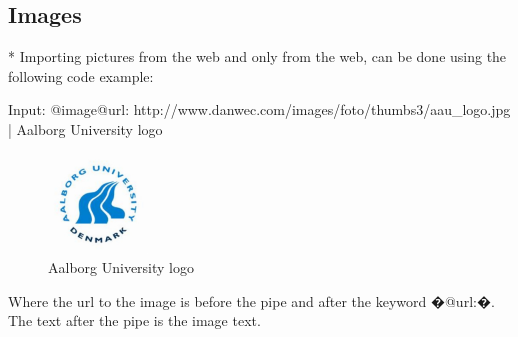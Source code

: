 \subsection{Images}*
Importing pictures from the web and only from the web, can be done using the following code example:

\begin{spverbatim}
Input: @image{@url: http://www.danwec.com/images/foto/thumbs3/aau_logo.jpg  | Aalborg University logo}
\end{spverbatim}

\begin{figure}[! h]
\centering
	 \includegraphics[width=100px]{images/aau_logo.jpg}
		 \caption{Aalborg University logo}	
	\label{fig:Imageimport}
\end{figure}

Where the url to the image is before the pipe and after the keyword �@url:�. The text after the pipe is the image text.